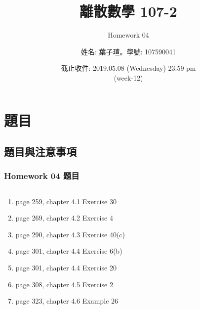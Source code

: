 \documentclass[14pt,hyperref={bookmarks=false}]{beamer}
\title{離散數學 107-2}
\subtitle{Homework 04}
\author{姓名: 葉子瑄。學號: 107590041}
\date{截止收件: 2019.05.08 (Wednesday) 23:59 pm \\ (week-12)}
\begin{document}

\begin{frame}
\titlepage
\end{frame}

\raggedright

\begin{frame}
\footnotesize
\tableofcontents
\end{frame}
	
\section{題目}

	\subsection{題目與注意事項}
	
	\begin{frame}
	\frametitle{Homework 04 題目}
	\fontsize{11pt}{12pt}\selectfont
	\setlength{\baselineskip}{5pt}
	\begin{columns}
	\begin{column}{0.68\textwidth}
	\begin{enumerate}[label=(Prob. \arabic*)]
	\setlength\itemsep{0em}
	\item page 259, chapter 4.1 Exercise 30
	\item page 269, chapter 4.2 Exercise 4
	\item page 290, chapter 4.3 Exercise 40(c)
	\item page 301, chapter 4.4 Exercise 6(b)
	\item page 301, chapter 4.4 Exercise 20	
	\item page 308, chapter 4.5 Exercise 2
	\item page 323, chapter 4.6 Example 26
	\end{enumerate}
	\end{column}
	
	
	\end{columns}
	\end{frame}
	
\end{document}
